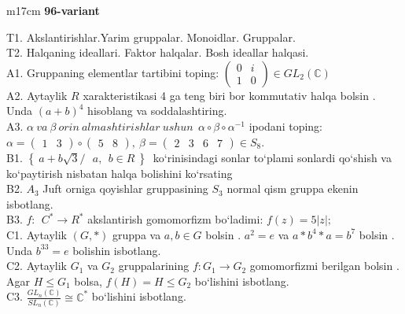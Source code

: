 \documentclass{article}
\begin{document}
\begin{tabular}{m{17cm}}
\textbf{96-variant}
\newline

T1. Akslantirishlar.Yarim gruppalar. Monoidlar. Gruppalar. \\
T2. Halqaning ideallari. Faktor halqalar. Bosh ideallar halqasi. \\
A1. Gruppaning elementlar tartibini toping: \(\begin{pmatrix}
0 & i \\
1 & 0
\end{pmatrix} \in GL_{2}(\mathbb{C})\) \\
A2. Aytaylik \(R\) xarakteristikasi 4 ga teng biri bor kommutativ halqa bo\textquotesingle lsin . Unda \((a + b)^{4}\) hisoblang va soddalashtiring. \\
A3. \(\alpha\ va\ \beta\ orin\ almashtirishlar\ ushun\ \ \alpha \circ \beta \circ \alpha^{- 1}\) ipodani toping:\(\alpha = \begin{pmatrix}
1 & 3
\end{pmatrix} \circ \begin{pmatrix}
5 & 8
\end{pmatrix},\ \beta = \begin{pmatrix}
2 & 3 & 6 & 7
\end{pmatrix} \in S_{8}\). \\
B1. \(\left\{ \left. \ a + b\sqrt{3}/\ \ \ a,\ \ b \in R\  \right\} \right.\ \) ko`rinisindagi sonlar to`plami sonlardi qo`shish va ko`paytirish nisbatan halqa bolishini ko`rsating \\
B2. \(A_{3}\) Juft orniga qoyishlar gruppasining \(S_{3}\) normal qism gruppa ekenin isbotlang. \\
B3. \(f:\ \ C^{*} \rightarrow R^{*}\) akslantirish gomomorfizm bo`ladimi: \(f(z) = 5|z|;\) \\
C1. Aytaylik \((G,*)\) gruppa va \(a,b \in G\) bo\textquotesingle lsin . \(a^{2} = e\) va \(a*b^{4}*a = b^{7}\) bo\textquotesingle lsin . Unda \(b^{33} = e\) bolishin isbotlang. \\
C2. Aytaylik \(G_{1}\) va \(G_{2}\) gruppalarining \(f:G_{1} \rightarrow G_{2}\) gomomorfizmi berilgan bo\textquotesingle lsin . Agar \(H \leq G_{1}\) bolsa, \(f(H) = H \leq G_{2}\) bo`lishini isbotlang. \\
C3. \(\frac{GL_{n}(\mathbb{C})}{SL_{n}(\mathbb{C})} \cong \mathbb{C}^{*}\) bo`lishini isbotlang.
 \\

\end{tabular}
\vspace{1cm}
\end{document}
